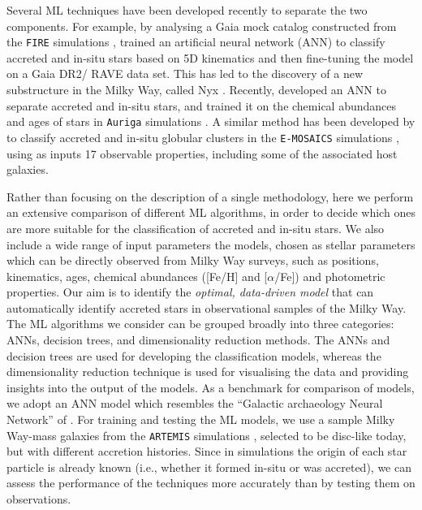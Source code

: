 Several ML techniques have been developed recently to separate the two components. For example, by analysing a Gaia mock catalog constructed from the \texttt{FIRE} simulations \citep{Sanderson2020}, \citet{Ostdiek2020} trained an artificial neural network (ANN) to classify accreted and in-situ stars based on 5D kinematics and then fine-tuning the model on a Gaia DR2/ RAVE data set. This has led to the discovery of a new substructure in the Milky Way, called Nyx \citep{Necib2020a}. Recently, \citet{Tronrud2022} developed an ANN to separate accreted and in-situ stars, and trained it on the chemical abundances and ages of stars in \texttt{Auriga} simulations \citep{Grand2017}. A similar method has been developed by \citet{TrujilloGomez2023} to classify accreted and in-situ globular clusters in the \texttt{E-MOSAICS} simulations \citep{Pfeffer2018}, using as inputs 17 observable properties, including some of the associated host galaxies.

Rather than focusing on the description of a single methodology, here we perform an extensive comparison of different ML algorithms, in order to decide which ones are more suitable for the classification of accreted and in-situ stars. We also include a wide range of input parameters the models, chosen as stellar parameters which can be directly observed from Milky Way surveys, such as positions, kinematics, ages, chemical abundances ([Fe/H] and [$\alpha$/Fe]) and photometric properties. Our aim is to identify the {\it optimal, data-driven model} that can automatically identify accreted stars in observational samples of the Milky Way. The ML algorithms we consider can be grouped broadly into three categories: ANNs, decision trees, and dimensionality reduction methods. The ANNs and decision trees are used for developing the classification models, whereas the dimensionality reduction technique is used for visualising the data and providing insights into the output of the models. As a benchmark for comparison of models, we adopt an ANN model which resembles the ``Galactic archaeology Neural Network'' of \citet{Tronrud2022}. For training and testing the ML models, we use a sample Milky Way-mass galaxies from the \texttt{ARTEMIS} simulations \citep{Font2020}, selected to be disc-like today, but with different accretion histories. Since in simulations the origin of each star particle is already known (i.e., whether it formed in-situ or was accreted), we can assess the performance of the techniques more accurately than by testing them on observations.

